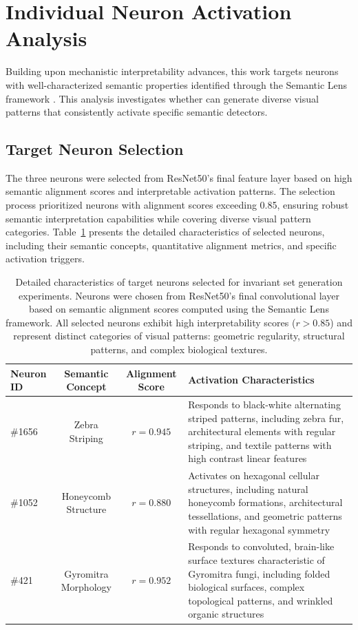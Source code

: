 \section{Individual Neuron Activation Analysis}

Building upon mechanistic interpretability advances, this work targets neurons with well-characterized semantic properties identified through the Semantic Lens framework \citep{dreyer2025mechanisticunderstandingvalidationlarge}. This analysis investigates whether \method{} can generate diverse visual patterns that consistently activate specific semantic detectors.

\subsection{Target Neuron Selection}

The three neurons were selected from ResNet50's final feature layer based on high semantic alignment scores and interpretable activation patterns. The selection process prioritized neurons with alignment scores exceeding 0.85, ensuring robust semantic interpretation capabilities while covering diverse visual pattern categories. Table~\ref{tab:target_neurons} presents the detailed characteristics of selected neurons, including their semantic concepts, quantitative alignment metrics, and specific activation triggers.

\begin{table}[h!]
\centering
\begin{tabular}{lccp{6cm}}
\toprule
\textbf{Neuron ID} & \textbf{Semantic Concept} & \textbf{Alignment Score} & \textbf{Activation Characteristics} \\
\midrule
\#1656 & Zebra Striping & $r = 0.945$ & Responds to black-white alternating striped patterns, including zebra fur, architectural elements with regular striping, and textile patterns with high contrast linear features \\
\#1052 & Honeycomb Structure & $r = 0.880$ & Activates on hexagonal cellular structures, including natural honeycomb formations, architectural tessellations, and geometric patterns with regular hexagonal symmetry \\
\#421 & Gyromitra Morphology & $r = 0.952$ & Responds to convoluted, brain-like surface textures characteristic of Gyromitra fungi, including folded biological surfaces, complex topological patterns, and wrinkled organic structures \\
\bottomrule
\end{tabular}
\caption{Detailed characteristics of target neurons selected for invariant set generation experiments. Neurons were chosen from ResNet50's final convolutional layer based on semantic alignment scores computed using the Semantic Lens framework. All selected neurons exhibit high interpretability scores ($r > 0.85$) and represent distinct categories of visual patterns: geometric regularity, structural patterns, and complex biological textures.}
\label{tab:target_neurons}
\end{table}


